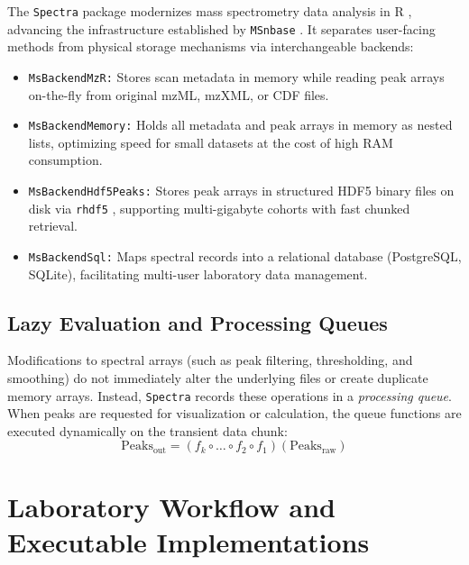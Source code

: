 \documentclass[11pt,twoside,openright]{book}
\begin{document}
The \texttt{Spectra} package modernizes mass spectrometry data analysis in R \cite{gatto2021spectra, rainer2022msexperiment}, advancing the infrastructure established by \texttt{MSnbase} \cite{gatto2012msnbase}. It separates user-facing methods from physical storage mechanisms via interchangeable backends:
\begin{itemize}
    \item \texttt{MsBackendMzR:} Stores scan metadata in memory while reading peak arrays on-the-fly from original mzML, mzXML, or CDF files.
    \item \texttt{MsBackendMemory:} Holds all metadata and peak arrays in memory as nested lists, optimizing speed for small datasets at the cost of high RAM consumption.
    \item \texttt{MsBackendHdf5Peaks:} Stores peak arrays in structured HDF5 binary files on disk via \texttt{rhdf5} \cite{fischer2020rhdf5}, supporting multi-gigabyte cohorts with fast chunked retrieval.
    \item \texttt{MsBackendSql:} Maps spectral records into a relational database (PostgreSQL, SQLite), facilitating multi-user laboratory data management.
\end{itemize}

\subsection{Lazy Evaluation and Processing Queues}

Modifications to spectral arrays (such as peak filtering, thresholding, and smoothing) do not immediately alter the underlying files or create duplicate memory arrays. Instead, \texttt{Spectra} records these operations in a \textit{processing queue}. When peaks are requested for visualization or calculation, the queue functions are executed dynamically on the transient data chunk:
\begin{equation}
\text{Peaks}_{\text{out}} = (f_k \circ \dots \circ f_2 \circ f_1)(\text{Peaks}_{\text{raw}})
\end{equation}

\section{Laboratory Workflow and Executable Implementations}
\label{sec:lab_implementation}
\end{document}
